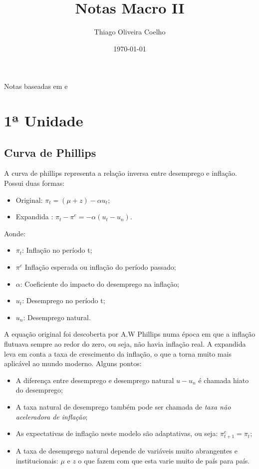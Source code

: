 \documentclass[12pt,a4paper,oneside,brazil]{abntex2}
\title{Notas Macro II}
\author{Thiago Oliveira Coelho}
\date{\today}
\begin{document}
\pagestyle{headings}
\maketitle
\begin{center}
Notas baseadas em \cite{blanchard} e \cite{rudiger}
\end{center}
\tableofcontents
\chapter{1ª Unidade}
\section{Curva de Phillips}
A curva de phillips representa a relação inversa entre desemprego e inflação.
Possui duas formas:
\begin{itemize}
\item Original: $\pi_t = (\mu + z) - \alpha u_t$;
\item Expandida : $\pi_t - \pi^e  =  - \alpha (u_t - u_n)$.
\end{itemize}
Aonde: \begin{itemize}
\item  $\pi_t$: Inflação no período t;
\item $\pi^e$ Inflação esperada ou inflação do período passado;
\item $\alpha$: Coeficiente do impacto do desemprego na inflação;
\item $u_t$: Desemprego no período t;
\item $u_n$: Desemprego natural.
\end{itemize}
A equação original foi descoberta  por A.W Phillips numa época em que a inflação flutuava sempre ao redor do zero, ou seja, não havia inflação real. A expandida leva em conta a taxa de crescimento da inflação, o que a torna muito mais aplicável ao mundo moderno.
Alguns pontos:
\begin{itemize}
\item A diferença entre desemprego e desemprego natural $u - u_n$ é chamada hiato do desemprego;
\item A taxa natural de desemprego também pode ser chamada de \emph{taxa não aceleradora de inflação};
\item As expectativas de inflação neste modelo são adaptativas, ou seja: $\pi^e_{t+1} = \pi_t$;
\item A taxa de desemprego natural depende de variáveis muito abrangentes e institucionais: $\mu$ e $z$ o que fazem com que esta varie muito de país para país.
\end{itemize}
\clearpage
\end{document}
